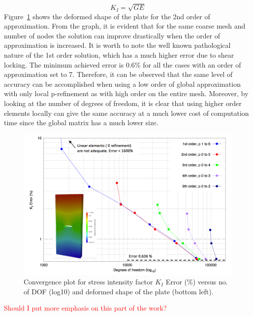 \documentclass[11pt]{acmeArticle}
\numberwithin{equation}{section}
\begin{document}
\begin{equation}
K_I = \sqrt{GE}
\end{equation}
Figure~\ref{fig:plate_conv_no_sing} shows the deformed shape of the plate for the 2nd order of approximation. From the graph, it is evident that for the same coarse mesh and number of nodes the solution can improve drastically when the order of approximation is increased. It is worth to note the well known pathological nature of the 1st order solution, which has a much higher error due to shear locking. The minimum achieved error is $0.6\%$ for all the cases with an order of approximation set to 7. Therefore, it can be observed that the same level of accuracy can be accomplished when using a low order of global approximation with only local p-refinement as with high order on the entire mesh. Moreover, by looking at the number of degrees of freedom, it is clear that using higher order elements locally can give the same accuracy at a much lower cost of computation time since the global matrix has a much lower size.
\begin{figure}
	\centering
	\includegraphics[width=0.7\linewidth]{Figures/graphs/plate_conv_no_sing.png}
	\caption{Convergence plot for stress intensity factor $K_I$ Error (\%) versus no. of DOF (log10) and deformed shape of the plate (bottom left).}
	\label{fig:plate_conv_no_sing}
\end{figure}
\textcolor{red}{Should I put more emphasis on this part of the work?}
\end{document}
